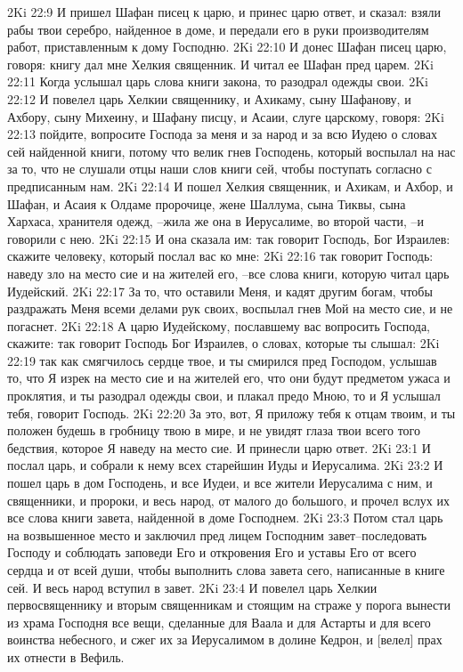 2Ki 22:9  И пришел Шафан писец к царю, и принес царю ответ, и сказал: взяли рабы твои серебро, найденное в доме, и передали его в руки производителям работ, приставленным к дому Господню.
2Ki 22:10  И донес Шафан писец царю, говоря: книгу дал мне Хелкия священник. И читал ее Шафан пред царем.
2Ki 22:11  Когда услышал царь слова книги закона, то разодрал одежды свои.
2Ki 22:12  И повелел царь Хелкии священнику, и Ахикаму, сыну Шафанову, и Ахбору, сыну Михеину, и Шафану писцу, и Асаии, слуге царскому, говоря:
2Ki 22:13  пойдите, вопросите Господа за меня и за народ и за всю Иудею о словах сей найденной книги, потому что велик гнев Господень, который воспылал на нас за то, что не слушали отцы наши слов книги сей, чтобы поступать согласно с предписанным нам.
2Ki 22:14  И пошел Хелкия священник, и Ахикам, и Ахбор, и Шафан, и Асаия к Олдаме пророчице, жене Шаллума, сына Тиквы, сына Хархаса, хранителя одежд, --жила же она в Иерусалиме, во второй части, --и говорили с нею.
2Ki 22:15  И она сказала им: так говорит Господь, Бог Израилев: скажите человеку, который послал вас ко мне:
2Ki 22:16  так говорит Господь: наведу зло на место сие и на жителей его, --все слова книги, которую читал царь Иудейский.
2Ki 22:17  За то, что оставили Меня, и кадят другим богам, чтобы раздражать Меня всеми делами рук своих, воспылал гнев Мой на место сие, и не погаснет.
2Ki 22:18  А царю Иудейскому, пославшему вас вопросить Господа, скажите: так говорит Господь Бог Израилев, о словах, которые ты слышал:
2Ki 22:19  так как смягчилось сердце твое, и ты смирился пред Господом, услышав то, что Я изрек на место сие и на жителей его, что они будут предметом ужаса и проклятия, и ты разодрал одежды свои, и плакал предо Мною, то и Я услышал тебя, говорит Господь.
2Ki 22:20  За это, вот, Я приложу тебя к отцам твоим, и ты положен будешь в гробницу твою в мире, и не увидят глаза твои всего того бедствия, которое Я наведу на место сие. И принесли царю ответ.
2Ki 23:1  И послал царь, и собрали к нему всех старейшин Иуды и Иерусалима.
2Ki 23:2  И пошел царь в дом Господень, и все Иудеи, и все жители Иерусалима с ним, и священники, и пророки, и весь народ, от малого до большого, и прочел вслух их все слова книги завета, найденной в доме Господнем.
2Ki 23:3  Потом стал царь на возвышенное место и заключил пред лицем Господним завет--последовать Господу и соблюдать заповеди Его и откровения Его и уставы Его от всего сердца и от всей души, чтобы выполнить слова завета сего, написанные в книге сей. И весь народ вступил в завет.
2Ki 23:4  И повелел царь Хелкии первосвященнику и вторым священникам и стоящим на страже у порога вынести из храма Господня все вещи, сделанные для Ваала и для Астарты и для всего воинства небесного, и сжег их за Иерусалимом в долине Кедрон, и [велел] прах их отнести в Вефиль.
